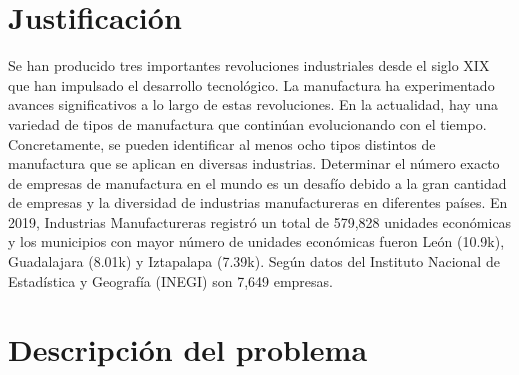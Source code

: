     \section{Justificación}
    
    Se han producido tres importantes revoluciones industriales desde el siglo XIX que han impulsado el desarrollo tecnológico. La manufactura ha experimentado avances significativos a lo largo de estas revoluciones.
    En la actualidad, hay una variedad de tipos de manufactura que continúan evolucionando con el tiempo. Concretamente, se pueden identificar al menos ocho tipos distintos de manufactura que se aplican en diversas industrias.\cite{IGN}
    Determinar el número exacto de empresas de manufactura en el mundo es un desafío debido a la gran cantidad de empresas y la diversidad de industrias manufactureras en diferentes países.
    En 2019, Industrias Manufactureras registró un total de 579,828 unidades económicas y los municipios con mayor número de unidades económicas fueron León (10.9k), Guadalajara (8.01k) y Iztapalapa (7.39k).\cite{IndustriasManufactureras}
    Según datos del Instituto Nacional de Estadística y Geografía (INEGI) son 7,649 empresas.\cite{INEGI}
    \section{Descripción del problema}
    
